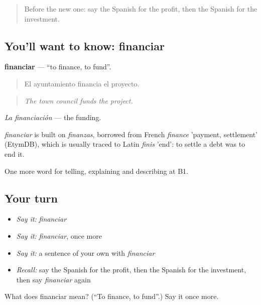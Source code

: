 \label{lesson:ES-C629-financiar}



\begin{quote}
Before the new one: say the Spanish for the profit, then the Spanish for the investment.
\end{quote}

\subsection*{You'll want to know: financiar}
\textbf{financiar} — \textquotedblleft{}to finance, to fund\textquotedblright{}.

\begin{quote}
El ayuntamiento financia el proyecto.
\end{quote}

\begin{quote}
\emph{The town council funds the project.}
\end{quote}

\emph{La financiación} — the funding.

\begin{cousinweb}
\emph{financiar} is built on \emph{finanzas}, borrowed from French \emph{finance} 'payment, settlement' (EtymDB), which is usually traced to Latin \emph{finis} 'end': to settle a debt was to end it.
\end{cousinweb}

\begin{grammarlens}[title={What you've built}]
One more word for telling, explaining and describing at B1.
\end{grammarlens}

\subsection*{Your turn}
\begin{itemize}
\raggedright
  \item \emph{Say it:} \emph{financiar}
  \item \emph{Say it:} \emph{financiar}, once more
  \item \emph{Say it:} a sentence of your own with \emph{financiar}
  \item \emph{Recall:} say the Spanish for the profit, then the Spanish for the investment, then say \emph{financiar} again
\end{itemize}

\begin{tcolorbox}[breakable,colback=teal!4,colframe=teal!35!black,title={Before you move on}]
What does financiar mean? (\textquotedblleft{}To finance, to fund\textquotedblright{}.) Say it once more.
\end{tcolorbox}

